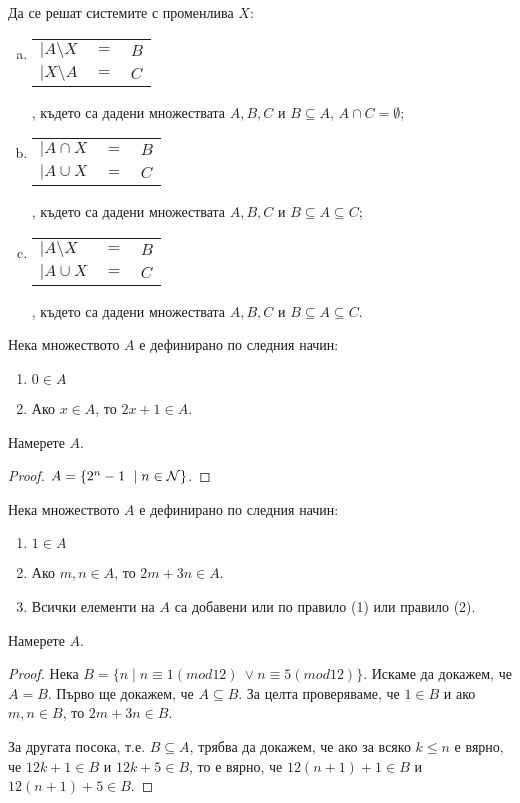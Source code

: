 \begin{problem}
  Да се решат системите с променлива $X$:
  \begin{enumerate}[(a)]
  \item
    \begin{tabular}{l c l}
      $\big|A\setminus X$ & $= $ & $ B$\\
      $\big|X\setminus A $ & $=$ & $ C$
    \end{tabular}, където са дадени множествата $A,B,C$ и $B\subseteq A$, $A\cap C = \emptyset$;
  \item
    \begin{tabular}{l c l}
      $\big|A\cap X$ & $= $ & $ B$\\
      $\big|A\cup X $ & $=$ & $ C$
    \end{tabular}, където са дадени множествата $A,B,C$ и $B\subseteq A\subseteq C$;
  \item
    \begin{tabular}{l c l}
      $\big|A\setminus X$ & $= $ & $ B$\\
      $\big|A\cup X $ & $=$ & $ C$
    \end{tabular}, където са дадени множествата $A,B,C$ и $B\subseteq A\subseteq C$.
  \end{enumerate}
\end{problem}



\begin{problem}
  Нека множеството $A$ е дефинирано по следния начин:
  \begin{enumerate}
  \item
    $0\in A$
  \item
    Ако $x\in A$, то $2x+1 \in A$.
\end{enumerate}
Намерете $A$.
\end{problem}
\begin{proof}
  $A = \{2^n - 1\ \mid n\in\mathcal{N}\}$.
\end{proof}

\begin{thm}
  Нека множеството $A$ е дефинирано по следния начин:
  \begin{enumerate}[(1)]
  \item
    $1\in A$
  \item
    Ако $m,n\in A$, то $2m+3n \in A$.
  \item
    Всички елементи на $A$ са добавени или по правило (1) или правило (2).
\end{enumerate}
Намерете $A$.
\end{thm}
\begin{proof}
  Нека $B = \{n \mid n\equiv 1 (mod 12)\ \vee n\equiv 5 (mod 12) \}$.
  Искаме да докажем, че $A = B$.
  Първо ще докажем, че $A\subseteq B$.
  За целта проверяваме, че $1\in B$ и ако $m,n \in B$, то $2m+3n \in B$.
  
  За другата посока, т.е. $B\subseteq A$, трябва да докажем, че ако
  за всяко $k\leq n$ е вярно, че $12k+1 \in B$ и $12k + 5 \in B$,
  то е вярно, че $12(n+1)+1 \in B $ и $12(n+1) + 5 \in B$.
\end{proof}



